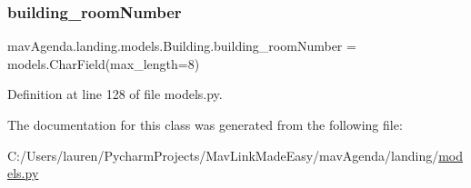 \subsubsection{\texorpdfstring{building\+\_\+room\+Number}{building\_roomNumber}}
{\footnotesize\ttfamily mav\+Agenda.\+landing.\+models.\+Building.\+building\+\_\+room\+Number = models.\+Char\+Field(max\+\_\+length=8)\hspace{0.3cm}{\ttfamily [static]}}



Definition at line 128 of file models.\+py.



The documentation for this class was generated from the following file\+:\begin{DoxyCompactItemize}
\item 
C\+:/\+Users/lauren/\+Pycharm\+Projects/\+Mav\+Link\+Made\+Easy/mav\+Agenda/landing/\mbox{\hyperlink{models_8py}{models.\+py}}\end{DoxyCompactItemize}
